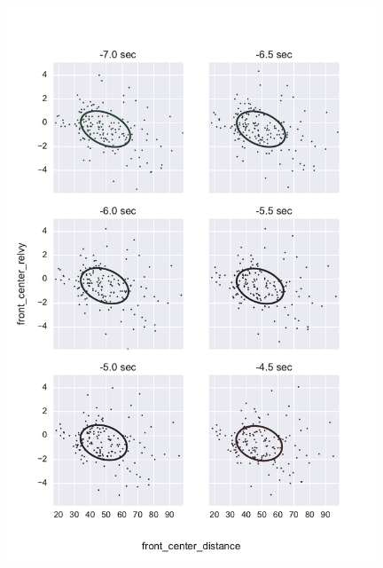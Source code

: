\begin{figure}[p]
  \centering
    \includegraphics[width=11cm,keepaspectratio]{fig/scatter_ellipse_front_center_distance_front_center_relvy1.pdf}
\end{figure}
